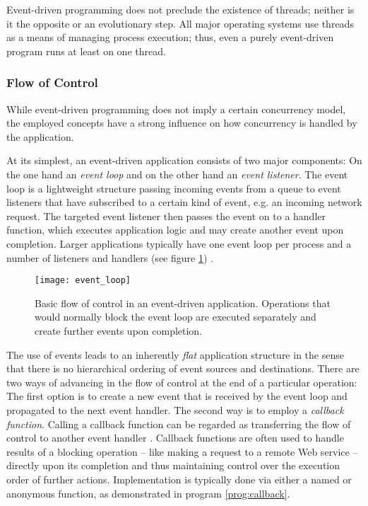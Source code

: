Event-driven programming does not preclude the existence of threads; neither is it the opposite or an evolutionary step. All major operating systems use threads as a means of managing process execution; thus, even a purely event-driven program runs at least on one thread.

\subsubsection*{Flow of Control}
\label{lab:flow}
While event-driven programming does not imply a certain concurrency model, the employed concepts have a strong influence on how concurrency is handled by the application.

At its simplest, an event-driven application consists of two major components: On the one hand an \textit{event loop} and on the other hand an \textit{event listener}. The event loop is a lightweight structure passing incoming events from a queue to event listeners that have subscribed to a certain kind of event, e.g. an incoming network request. The targeted event listener then passes the event on to a handler function, which executes application logic and may create another event upon completion. Larger applications typically have one event loop per process and a number of listeners and handlers (see figure \ref{fig:event_loop}) \cite[p. 33]{Hughes-Croucher2012}.

\begin{figure}
\centering\small
\setlength{\tabcolsep}{0mm}
  \texttt{[image: event\_loop]}
\caption{
Basic flow of control in an event-driven application. Operations that would normally block the event loop are executed separately and create further events upon completion.
}
\label{fig:event_loop}
\end{figure}

The use of events leads to an inherently \textit{flat} application structure in the sense that there is no hierarchical ordering of event sources and destinations. There are two ways of advancing in the flow of control at the end of a particular operation: The first option is to create a new event that is received by the event loop and propagated to the next event handler. The second way is to employ a \textit{callback function}. Calling a callback function can be regarded as transferring the flow of control to another event handler \cite[p. 92]{Erb2012}. Callback functions are often used to handle results of a blocking operation -- like making a request to a remote Web service -- directly upon its completion and thus maintaining control over the execution order of further actions. Implementation is typically done via either a named or anonymous function, as demonstrated in program \ref{prog:callback}.

